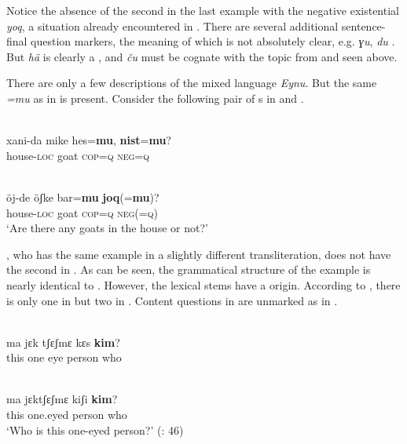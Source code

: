 Notice the absence of the second  in the last example with the negative existential \textit{yoq}, a situation already encountered in  . There are several additional sentence-final question markers, the meaning of which is not absolutely clear, e.g. \textit{ɣu}, \textit{du} \citep[208]{Abdurehim2014}. But \textit{hä} is clearly a , and \textit{ču} must be cognate with the topic  from  and  seen above.

There are only a few descriptions of the mixed language \textit{Eynu}. But the same  \textit{=mu} as in  is present. Consider the following pair of s in  and .

\ea%
    \label{ex:turk:33}
    \\
    \gll xani-da  mike  hes=\textbf{{mu}}, \textbf{{nist}}{=}\textbf{{mu}}?\\
    house-\textsc{loc}  goat  \textsc{cop}=\textsc{q}    \textsc{neg}=\textsc{q}\\
    \z

\ea%
    \label{ex:turk:34}
    \\
    \gll öj-de    öʃke  bar=\textbf{{mu}} \textbf{{joq}}{(=}\textbf{{mu}})?\\
    house-\textsc{loc}  goat  \textsc{cop=q}    \textsc{neg(}=\textsc{q)}\\
    \glt ‘Are there any goats in the house or not?’ \citep[245]{Wurm1997}
    \z

\noindent \citet[860]{Lee-Smith1996a}, who has the same example in a slightly different transliteration, does not have the second  in . As can be seen, the grammatical structure of the  example is nearly identical to . However, the lexical stems have a  origin. According to \citet[315]{ZhaoAximu2011}, there is only one  in  but two in . Content questions in  are unmarked as in .

\ea%
    \label{ex:turk:35}
    \\
    \gll ma  jɛk  tʃɛʃmɛ  kɛs \textbf{{kim}}?\\
    this  one  eye  person  who\\
    \z

\ea%
    \label{ex:turk:36}
    \\
    \gll ma  jɛktʃɛʃmɛ  kiʃi \textbf{{kim}}?\\
    this  one.eyed  person  who\\
    \glt ‘Who is this one-eyed person?’ (\citealt{ZhaoAximu1981}: 46)
    \z

